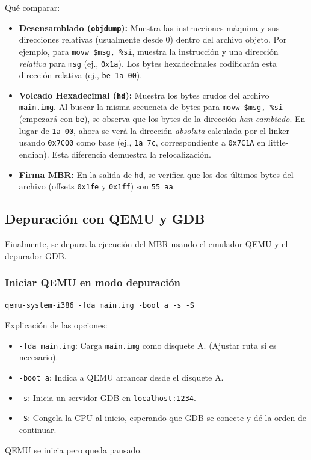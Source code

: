 Qué comparar:
\begin{itemize}[noitemsep]
    \item \textbf{Desensamblado (\texttt{objdump}):} Muestra las instrucciones máquina y sus direcciones relativas (usualmente desde 0) dentro del archivo objeto. Por ejemplo, para \texttt{movw \$msg, \%si}, muestra la instrucción y una dirección \textit{relativa} para \texttt{msg} (ej., \texttt{0x1a}). Los bytes hexadecimales codificarán esta dirección relativa (ej., \texttt{be 1a 00}).
    \item \textbf{Volcado Hexadecimal (\texttt{hd}):} Muestra los bytes crudos del archivo \texttt{main.img}. Al buscar la misma secuencia de bytes para \texttt{movw \$msg, \%si} (empezará con \texttt{be}), se observa que los bytes de la dirección \textit{han cambiado}. En lugar de \texttt{1a 00}, ahora se verá la dirección \textit{absoluta} calculada por el linker usando \texttt{0x7C00} como base (ej., \texttt{1a 7c}, correspondiente a \texttt{0x7C1A} en little-endian). Esta diferencia demuestra la relocalización.
    \item \textbf{Firma MBR:} En la salida de \texttt{hd}, se verifica que los dos últimos bytes del archivo (offsets \texttt{0x1fe} y \texttt{0x1ff}) son \texttt{55 aa}.
\end{itemize}

\subsection{Depuración con QEMU y GDB}

Finalmente, se depura la ejecución del MBR usando el emulador QEMU y el depurador GDB.

\subsubsection{Iniciar QEMU en modo depuración}

\begin{lstlisting}[style=BashInputStyle, caption=Lanzar QEMU esperando a GDB]
qemu-system-i386 -fda main.img -boot a -s -S
\end{lstlisting}
Explicación de las opciones:
\begin{itemize}[noitemsep]
    \item \texttt{-fda main.img}: Carga \texttt{main.img} como disquete A. (Ajustar ruta si es necesario).
    \item \texttt{-boot a}: Indica a QEMU arrancar desde el disquete A.
    \item \texttt{-s}: Inicia un servidor GDB en \texttt{localhost:1234}.
    \item \texttt{-S}: Congela la CPU al inicio, esperando que GDB se conecte y dé la orden de continuar.
\end{itemize}
QEMU se inicia pero queda pausado.

